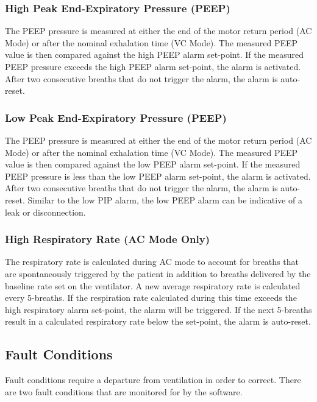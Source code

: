 \documentclass[]{article}
\begin{document}
\subsubsection{High Peak End-Expiratory Pressure (PEEP)}
The PEEP pressure is measured at either the end of the motor return period (AC Mode) or after the nominal exhalation time (VC Mode).  The measured PEEP value is then compared against the high PEEP alarm set-point.  If the measured PEEP pressure exceeds the high PEEP alarm set-point, the alarm is activated. After two consecutive breaths that do not trigger the alarm, the alarm is auto-reset.

\subsubsection{Low Peak End-Expiratory Pressure (PEEP)}
The PEEP pressure is measured at either the end of the motor return period (AC Mode) or after the nominal exhalation time (VC Mode).  The measured PEEP value is then compared against the low PEEP alarm set-point.  If the measured PEEP pressure is less than the low PEEP alarm set-point, the alarm is activated. After two consecutive breaths that do not trigger the alarm, the alarm is auto-reset.  Similar to the low PIP alarm, the low PEEP alarm can be indicative of a leak or disconnection.

\subsubsection{High Respiratory Rate (AC Mode Only)}
The respiratory rate is calculated during AC mode to account for breaths that are spontaneously triggered by the patient in addition to breaths delivered by the baseline rate set on the ventilator.  A new average respiratory rate is calculated every 5-breaths.  If the respiration rate calculated during this time exceeds the high respiratory alarm set-point, the alarm will be triggered.  If the next 5-breaths result in a calculated respiratory rate below the set-point, the alarm is auto-reset. 


\subsection{Fault Conditions}
\label{sect:fault}

Fault conditions require a departure from ventilation in order to correct.  There are two fault conditions that are monitored for by the software.
\end{document}
